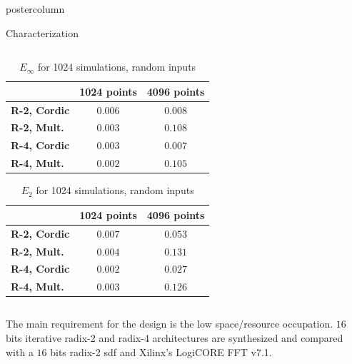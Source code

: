 \documentclass[final]{beamer}
\begin{document}
\begin{frame}{}
\begin{columns}
\begin{column}{.5\textwidth}
\begin{beamercolorbox}[center,wd=\textwidth]{postercolumn}
\begin{minipage}[T]{.99\textwidth}
{\begin{block}{Characterization}
\begin{column}{.37\textwidth}
			\end{column}
			\vrule
			\begin{column}{.52\textwidth}
				\begin{table}[htb!]
				\caption{$E_\infty$ for 1024 simulations, random inputs}
				\begin{tabular}{l c c}
				 & \textbf{1024 points} & \textbf{4096 points}\\ \hline 
				\textbf{R-2, Cordic} & $0.006$ & $0.008 $\\
				\textbf{R-2, Mult.} & $0.003$ & $0.108$\\
				\textbf{R-4, Cordic} & $0.003$ & $0.007$\\
				\textbf{R-4, Mult.} & $0.002$ & $0.105$\\\hline
				\end{tabular}
				\label{table:errorInf}
				\end{table}
				\begin{table}[htb!]
				\caption{$E_2$ for 1024 simulations, random inputs}
				\begin{tabular}{l c c}
				 & \textbf{1024 points} & \textbf{4096 points}\\ \hline 
				\textbf{R-2, Cordic} & $0.007$  & $0.053$\\
				\textbf{R-2, Mult.} & $0.004$ & $0.131$\\
				\textbf{R-4, Cordic} & $0.002$ & $0.027$\\
				\textbf{R-4, Mult.} & $0.003$ & $0.126$\\\hline 
				\end{tabular}
				\label{table:error2}
				\end{table}
			\end{column}
			
			\begin{column}{.32\textwidth}
			The main requirement for the design is the low space/resource occupation. $16$ bits iterative radix-2 and radix-4 architectures are 
			synthesized and compared with a $16$ bits radix-2 sdf and Xilinx's LogiCORE FFT v7.1.
				

\end{column}
\end{block}}
\end{minipage}
\end{beamercolorbox}
\end{column}
\end{columns}
\end{frame}
\end{document}
